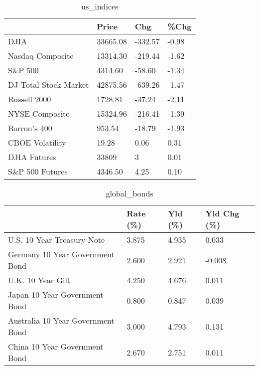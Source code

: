 \documentclass{article}%
\begin{document}
%


\begin{table}[htbp]%
\caption{us\_indices}%
\centering%
\begin{adjustbox}{width=1\textwidth}%
\begin{tabular}{llll}
\toprule
                      &    Price &     Chg &  \%Chg \\
\midrule
                 DJIA & 33665.08 & -332.57 & -0.98 \\
     Nasdaq Composite & 13314.30 & -219.44 & -1.62 \\
              S\&P 500 &  4314.60 &  -58.60 & -1.34 \\
DJ Total Stock Market & 42875.56 & -639.26 & -1.47 \\
         Russell 2000 &  1728.81 &  -37.24 & -2.11 \\
       NYSE Composite & 15324.96 & -216.41 & -1.39 \\
         Barron's 400 &   953.54 &  -18.79 & -1.93 \\
      CBOE Volatility &    19.28 &    0.06 &  0.31 \\
         DJIA Futures &    33809 &       3 &  0.01 \\
      S\&P 500 Futures &  4346.50 &    4.25 &  0.10 \\
\bottomrule
\end{tabular}
%
\end{adjustbox}%
\end{table}

%


\begin{table}[htbp]%
\caption{global\_bonds}%
\centering%
\begin{adjustbox}{width=1\textwidth}%
\begin{tabular}{llll}
\toprule
                                  & Rate (\%) & Yld (\%) & Yld Chg (\%) \\
\midrule
       U.S. 10 Year Treasury Note &    3.875 &   4.935 &       0.033 \\
  Germany 10 Year Government Bond &    2.600 &   2.921 &      -0.008 \\
                U.K. 10 Year Gilt &    4.250 &   4.676 &       0.011 \\
    Japan 10 Year Government Bond &    0.800 &   0.847 &       0.039 \\
Australia 10 Year Government Bond &    3.000 &   4.793 &       0.131 \\
    China 10 Year Government Bond &    2.670 &   2.751 &       0.011 \\
\bottomrule
\end{tabular}
%
\end{adjustbox}%
\end{table}
\end{document}
